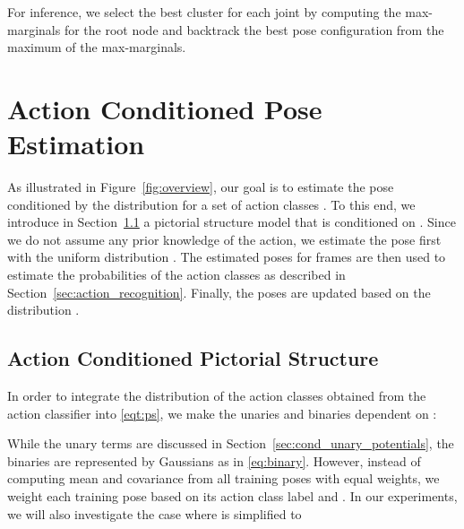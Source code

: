 \documentclass[a4paper, 10pt, conference]{ieeeconf}      \usepackage{FG2017}
\begin{document}
For inference, we select the best cluster  for each joint 
by computing the max-marginals for the root node and backtrack the best pose configuration from the maximum of the max-marginals.  

\section{Action Conditioned Pose Estimation}

As illustrated in Figure~\ref{fig:overview}, our goal is to estimate the pose  conditioned by the distribution  for a set of action classes . To this end, we introduce in Section~\ref{sec:action_cond_ps} a pictorial structure model that is conditioned on . Since we do not assume any prior knowledge of the action, we estimate the pose first with the uniform distribution . The estimated poses for  frames are then used to estimate the probabilities of the action classes  as described in Section~\ref{sec:action_recognition}. Finally, the poses  are updated based on the distribution .   

\subsection{Action Conditioned Pictorial Structure}
\label{sec:action_cond_ps}

In order to integrate the distribution  of the action classes obtained from the action classifier into \eqref{eqt:ps}, we make the unaries and binaries dependent on : 
 
While the unary terms are discussed in Section~\ref{sec:cond_unary_potentials}, the binaries  are represented by Gaussians as in \eqref{eq:binary}. However, instead of computing mean and covariance from all training poses with equal weights, we weight each training pose based on its action class label and . In our experiments, we will also investigate the case where  is simplified to   
 
\end{document}
